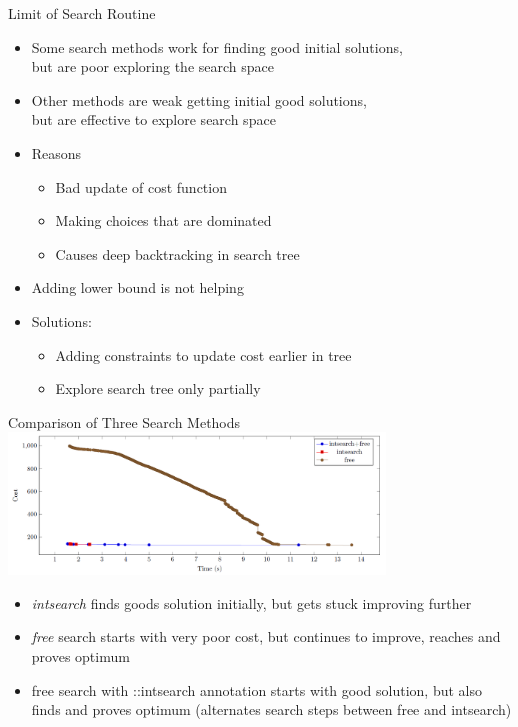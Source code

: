   \begin{frame}{Limit of Search Routine}
  \begin{itemize}   
  \item Some search methods work for finding good initial solutions,\\ but are poor exploring the search space
  \item Other methods are weak getting initial good solutions,\\ but are effective to explore search space
  \item Reasons
  \begin{itemize}
  \item Bad update of cost function
  \item Making choices that are dominated
  \item Causes deep backtracking in search tree
  \end{itemize}
  \item Adding lower bound is not helping
    \item Solutions: 
    \begin{itemize}
        \item Adding constraints to update cost earlier in tree
        \item Explore search tree only partially
    \end{itemize}
  \end{itemize}
\end{frame}


\begin{frame}{Comparison of Three Search Methods}
\includegraphics[width=10cm]{images/flowsearchcompare}   
\begin{itemize}
    \item \emph{intsearch} finds goods solution initially, but gets stuck improving further
    \item \emph{free} search starts with very poor cost, but continues to improve, reaches and proves optimum
    \item free search with ::intsearch annotation starts with good solution, but also finds and proves optimum (alternates search steps between free and intsearch)
\end{itemize}

\end{frame}

